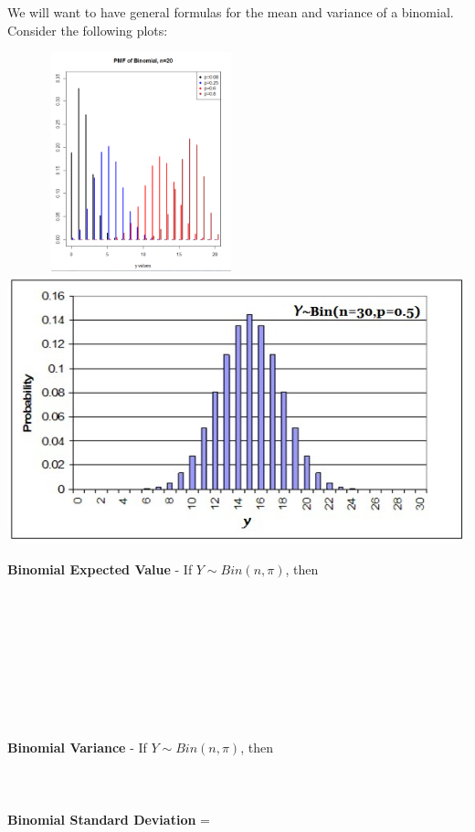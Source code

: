 We will want to have general formulas for the mean and variance of a binomial. Consider the following plots:
\begin{center}
\includegraphics[width=220pt, height=180pt]{chapter4/binomial}\includegraphics[scale=0.5]{chapter4/binomialdist}
\end{center}

\newpage

\textbf{Binomial Expected Value} - If $Y \sim Bin(n,\pi)$, then \\~\\~\\~\\~\\~\\~\\~\\~\\~\\

\textbf{Binomial Variance} - If $Y \sim Bin(n,\pi)$, then \\~\\~\\~\\

\textbf{Binomial Standard Deviation} = \\~\\~\\

